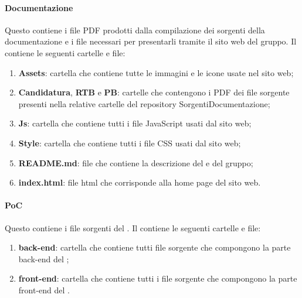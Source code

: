 \paragraph{Documentazione}
Questo  contiene i file PDF prodotti dalla compilazione dei sorgenti della documentazione e i file necessari per presentarli tramite il sito web del gruppo.
Il  contiene le seguenti cartelle e file:
\begin{enumerate}
    \item \textbf{Assets}: cartella che contiene tutte le immagini e le icone usate nel sito web;
    
    \item \textbf{Candidatura}, \textbf{RTB} e \textbf{PB}: cartelle che contengono i PDF dei file sorgente presenti nella relative cartelle del repository SorgentiDocumentazione;

    \item \textbf{Js}: cartella che contiene tutti i file JavaScript usati dal sito web;

    \item \textbf{Style}: cartella che contiene tutti i file CSS usati dal sito web;
    
    \item \textbf{README.md}: file che contiene la descrizione del  e del gruppo;
    
    \item \textbf{index.html}: file html che corrisponde alla home page del sito web.
\end{enumerate}

\paragraph{PoC}
Questo  contiene i file sorgenti del .
Il  contiene le seguenti cartelle e file:
\begin{enumerate}
    \item \textbf{back-end}: cartella che contiene tutti file sorgente che compongono la parte back-end del ;
    
    \item \textbf{front-end}: cartella che contiene tutti i file sorgente che compongono la parte front-end del .
\end{enumerate}

